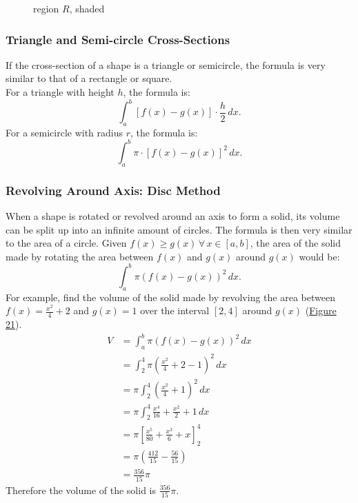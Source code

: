 \documentclass[12pt]{article}
\begin{document}
\begin{figure}[H]
    \begin{center}
        \caption{region $R$, shaded}
        \label{fig:srcross}
    \end{center}
\end{figure}

\subsubsection{Triangle and Semi-circle Cross-Sections}
If the cross-section of a shape is a triangle or semicircle, the formula is very similar to that of a rectangle or square.
\\ For a triangle with height $h$, the formula is:
\[ \int_a^b \left[ f(x) - g(x) \right] \cdot \frac{h}{2} \, dx. \]
For a semicircle with radius $r$, the formula is:
\[ \int_a^b \pi \cdot \left[ f(x) - g(x) \right]^2 \, dx. \]

\subsubsection{Revolving Around Axis: Disc Method}
When a shape is rotated or revolved around an axis to form a solid, its volume can be split up into an infinite amount of circles. The formula is then very similar to the area of a circle. Given $f(x) \ge g(x) \, \forall \, x \in [a, b]$, the area of the solid made by rotating the area between $f(x)$ and $g(x)$ around $g(x)$ would be:
\[ \int_a^b \pi \left( f(x) - g(x) \right)^2 \, dx. \]
For example, find the volume of the solid made by revolving the area between $f(x) = \frac{x^2}{4} + 2$ and $g(x) = 1$ over the interval $[2, 4]$ around $g(x)$ (\hyperref[fig:disc]{Figure 21}).
\begin{align*}
    V & = \int_a^b \pi \left( f(x) - g(x) \right)^2 \, dx           \\
      & = \int_2^4 \pi \left( \frac{x^2}{4} + 2 - 1 \right)^2 \, dx \\[6pt]
      & = \pi \int_2^4 \left( \frac{x^2}{4} + 1 \right)^2 \, dx     \\[6pt]
      & = \pi \int_2^4 \frac{x^4}{16} + \frac{x^2}{2} + 1 \, dx     \\[6pt]
      & = \pi \left[ \frac{x^5}{80} + \frac{x^3}{6} + x \right]_2^4 \\[6pt]
      & = \pi \left( \frac{412}{15} - \frac{56}{15} \right)         \\[6pt]
      & = \frac{356}{15} \pi
\end{align*}
Therefore the volume of the solid is $\frac{356}{15} \pi$.
\end{document}
